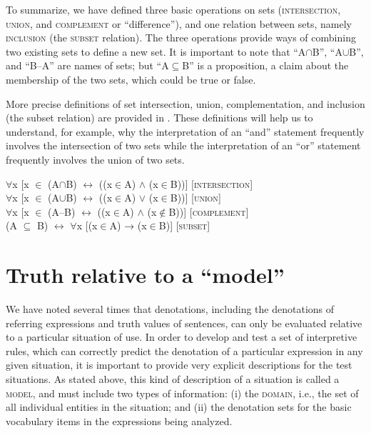 To summarize, we have defined three basic operations on sets (\textsc{intersection}, \textsc{union}, and \textsc{complement} or “difference”), and one relation between sets, namely \textsc{inclusion} (the \textsc{subset} relation). The three operations provide ways of combining two existing sets to define a new set. It is important to note that “A${\cap}$B”, “A${\cup}$B”, and “B–A” are names of sets; but “A${\subseteq}$B” is a proposition, a claim about the membership of the two sets, which could be true or false.



More precise definitions of set intersection, union, complementation, and inclusion (the subset relation) are provided in . These definitions will help us to understand, for example, why the interpretation of an “and” statement frequently involves the intersection of two sets while the interpretation of an “or” statement frequently involves the union of two sets.


\ea \label{ex:13.19}
${\forall}$x [x ${\in}$ (A${\cap}$B)  $\leftrightarrow $  ((x${\in}$A) $\wedge$ (x${\in}$B))] \hfill [\textsc{intersection}]\\
${\forall}$x [x ${\in}$ (A${\cup}$B)  $\leftrightarrow $  ((x${\in}$A) $\vee$ (x${\in}$B))] \hfill [\textsc{union}]\\
${\forall}$x [x ${\in}$ (A–B)  $\leftrightarrow $  ((x${\in}$A) $\wedge$ (x${\notin}$B))] \hfill [\textsc{complement}]\\
(A ${\subseteq}$ B)  $\leftrightarrow $  ${\forall}$x [(x${\in}$A) → (x${\in}$B)] \hfill [\textsc{subset}]
\z

\section{Truth relative to a “model”}\label{sec:13.4}

We have noted several times that denotations, including the denotations of referring expressions and truth values of sentences, can only be evaluated relative to a particular situation of use. In order to develop and test a set of interpretive rules, which can correctly predict the denotation of a particular expression in any given situation, it is important to provide very explicit descriptions for the test situations. As stated above, this kind of description of a situation is called a \textsc{model}, and must include two types of information: (i) the \textsc{domain}, i.e., the set of all individual entities in the situation; and (ii) the denotation sets for the basic vocabulary items in the expressions being analyzed.




